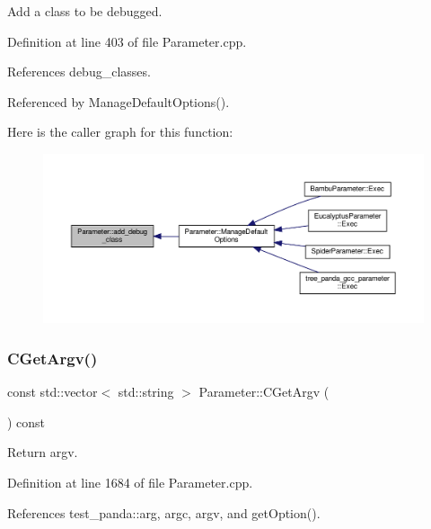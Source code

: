 Add a class to be debugged. 



Definition at line 403 of file Parameter.\+cpp.



References debug\+\_\+classes.



Referenced by Manage\+Default\+Options().

Here is the caller graph for this function\+:
\nopagebreak
\begin{figure}[H]
\begin{center}
\leavevmode
\includegraphics[width=350pt]{dc/dab/classParameter_a23133c375ea48e8584252e638d00dc89_icgraph}
\end{center}
\end{figure}
\mbox{\label{classParameter_ab6cceaeb45d6ff951af6befd227c73b2}} 
\subsubsection{\texorpdfstring{C\+Get\+Argv()}{CGetArgv()}}
{\footnotesize\ttfamily const std\+::vector$<$ std\+::string $>$ Parameter\+::\+C\+Get\+Argv (\begin{DoxyParamCaption}{ }\end{DoxyParamCaption}) const}



Return argv. 



Definition at line 1684 of file Parameter.\+cpp.



References test\+\_\+panda\+::arg, argc, argv, and get\+Option().

